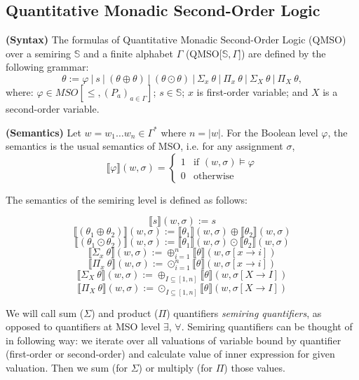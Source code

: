 \documentclass[12pt]{article}
\theoremstyle{definition}
\begin{document}
\subsection{Quantitative Monadic Second-Order Logic}

\textbf{(Syntax)} The formulas of Quantitative Monadic Second-Order Logic (QMSO) over a semiring $\mathbb{S}$ and a finite alphabet $\Gamma$ (QMSO[$\mathbb{S}, \Gamma$]) are defined by the following grammar:
$$ \theta := \varphi \ | \ s \ | \ (\theta \oplus \theta) \ | \ (\theta \odot \theta) \ | \ \Sigma_x \ \theta \ | \ \Pi_x \ \theta \ | \ \Sigma_X \ \theta \ | \ \Pi_X \ \theta,$$
where: $\varphi \in MSO[\leq, (P_a)_{a \in \Gamma}]$; $s \in \mathbb{S}$; $x$ is first-order variable; and $X$ is a second-order variable.

\textbf{(Semantics)} Let $w 
= w_1 \dots w_n \in \Gamma^*$ where $n = |w|$. For the Boolean level $\varphi$, the semantics is the usual semantics of MSO, i.e. for any assignment $\sigma$,
\begin{equation*}
    \llbracket\varphi\rrbracket(w, \sigma) =
      \begin{cases}
        1 & \text{if $(w, \sigma) \models \varphi$}\\
        0 & \text{otherwise}
      \end{cases}       
\end{equation*}

The semantics of the semiring level is defined as follows:

$$\llbracket s\rrbracket(w, \sigma) := s$$
$$\llbracket(\theta_1 \oplus \theta_2)\rrbracket(w, \sigma) := \llbracket\theta_1\rrbracket(w, \sigma) \oplus \llbracket\theta_2\rrbracket(w, \sigma)$$
$$\llbracket(\theta_1 \odot \theta_2)\rrbracket(w, \sigma) := \llbracket\theta_1\rrbracket(w, \sigma) \odot \llbracket\theta_2\rrbracket(w, \sigma)$$
$$\llbracket \Sigma_x \ \theta \rrbracket(w, \sigma) := \oplus^n_{i=1}\llbracket \theta \rrbracket (w, \sigma[x \rightarrow i])$$
$$\llbracket \Pi_x \ \theta \rrbracket(w, \sigma) := \odot^n_{i=1}\llbracket \theta \rrbracket (w, \sigma[x \rightarrow i])$$
$$\llbracket \Sigma_X \ \theta \rrbracket(w, \sigma) := \oplus_{I \subseteq [1,n]}\llbracket \theta \rrbracket (w, \sigma[X \rightarrow I])$$
$$\llbracket \Pi_X \ \theta \rrbracket(w, \sigma) := \odot_{I \subseteq [1,n]}\llbracket \theta \rrbracket (w, \sigma[X \rightarrow I])$$

We will call sum ($\Sigma$) and product ($\Pi$) quantifiers \emph{semiring quantifiers}, as opposed to quantifiers at MSO level $\exists$, $\forall$. Semiring quantifiers can be thought of in following way: we iterate over all valuations of variable bound by quantifier (first-order or second-order) and calculate value of inner expression for given valuation. Then we sum (for $\Sigma$) or multiply (for $\Pi$) those values.
\end{document}

